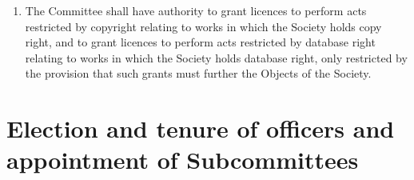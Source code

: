 \documentclass{article}
\begin{document}
\begin{enumerate}
\begin{enumerate}
{  Editor is not permitted by this section to grant licences.};
  \item The licence grant takes place not more than one year after the publication of the issue of the journal in which the work is included,
  and not more than five years after the acceptance of the work for
  publication;
  \item The licence grant only permits reproduction in accordance with the
  Objects of the Society.
  \end{enumerate}
\item The Committee shall have authority to grant licences to perform acts
restricted by copyright relating to works in which the Society holds copy
right, and to grant licences to perform acts restricted by database right
relating to works in which the Society holds database right, only restricted
by the provision that such grants must further the Objects of the Society.
\end{enumerate}



\section{Election and tenure of officers and appointment of Subcommittees}
\end{document}
